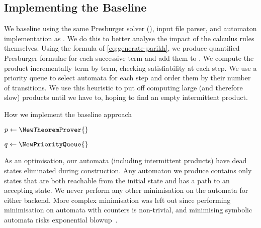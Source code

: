 \subsection{Implementing the Baseline}\label{sec:implementing-baseline}

We baseline using the same Presburger solver (\Princess{}), input file parser,
and automaton implementation as \Catra. We do this to better analyse the impact
of the calculus rules themselves. Using the formula of
\eqref{eq:generate-parikh}, we produce quantified Presburger formulae for each
successive term and add them to \Princess. We compute the product incrementally
term by term, checking satisfiability at each step. We use a priority queue to
select automata for each step and order them by their number of transitions. We
use this heuristic to put off computing large (and therefore slow) products until
we have to, hoping to find an empty intermittent product.

\begin{algorithm}
  \caption{How we implement the baseline approach}\label{alg:baseline}

  $p \gets \NewTheoremProver{}$



  $q \gets \NewPriorityQueue{}$


  

  \end{algorithm}

As an optimisation, our automata (including intermittent products) have dead
states eliminated during construction. Any automaton we produce contains only
states that are both reachable from the initial state and has a path to an
accepting state. We never perform any other minimisation on the automata for
either backend. More complex minimisation was left out since performing
minimisation on automata with counters is non-trivial, and minimising symbolic
automata risks exponential blowup~\cite{minimising-symbolic}.


